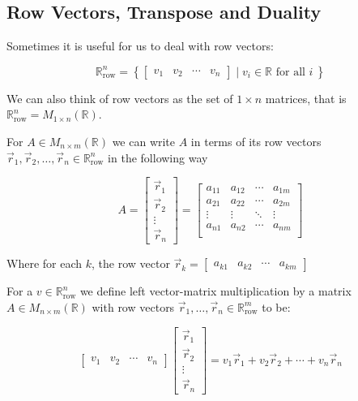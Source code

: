 

\clearpage

\subsection{Row Vectors, Transpose and Duality}

Sometimes it is useful for us to deal with row vectors:

$$
\mathbb{R}_\text{row}^n=\left\{ 
\begin{bmatrix}v_1 & v_2 & \cdots & v_n\end{bmatrix}
\mid v_i \in \mathbb{R} \text{ for all } i\ \right\}
$$

We can also think of row vectors as the set of $1 \times n $ matrices, that is $\mathbb{R}^n_\text{row} = M_{1 \times n}(\mathbb{R})$.

For $A \in  M_{n \times m}(\mathbb{R})$ we can write $A$ in terms of its row vectors $\vec{r}_1, \vec{r}_2, \ldots, \vec{r}_n \in \mathbb{R}^n_\text{row}$ in the 
following way

$$
A=\begin{bmatrix}\vec{r}_1 \\ \vec{r}_2 \\ \vdots \\ \vec{r}_n \end{bmatrix}=
\begin{bmatrix}
a_{11} & a_{12} & \cdots & a_{1m} \\
a_{21} & a_{22} & \cdots & a_{2m} \\
\vdots & \vdots & \ddots & \vdots \\
a_{n1} & a_{n2} & \cdots & a_{nm} \\
\end{bmatrix}
$$

Where for each $k$, the row vector $\vec{r}_k=\begin{bmatrix}a_{k1} & a_{k2} & \cdots & a_{km}\end{bmatrix}$

For a $v \in \mathbb{R}_\text{row}^n$ we define left vector-matrix multiplication by a matrix $A\in M_{n \times m}(\mathbb{R})$ with row vectors 
$\vec{r}_1, \ldots, \vec{r}_n \in \mathbb{R}^m_\text{row}$ to be:


$$
\begin{bmatrix}v_1 & v_2 & \cdots & v_n\end{bmatrix}\begin{bmatrix}\vec{r}_1 \\ \vec{r}_2 \\ \vdots \\ \vec{r}_n\end{bmatrix}
=v_1\vec{r}_1+v_2\vec{r}_2+ \cdots + v_n\vec{r}_n 
$$

